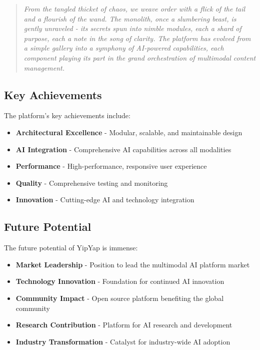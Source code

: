 \documentclass[11pt]{article}
\begin{document}
\begin{quote}
\emph{From the tangled thicket of chaos, we weave order with a flick of the tail and a flourish of the wand. The monolith, once a slumbering beast, is gently unraveled - its secrets spun into nimble modules, each a shard of purpose, each a note in the song of clarity. The platform has evolved from a simple gallery into a symphony of AI-powered capabilities, each component playing its part in the grand orchestration of multimodal content management.}
\end{quote}

\subsection{Key Achievements}

The platform's key achievements include:

\begin{itemize}
\item \textbf{Architectural Excellence} - Modular, scalable, and maintainable design
\item \textbf{AI Integration} - Comprehensive AI capabilities across all modalities
\item \textbf{Performance} - High-performance, responsive user experience
\item \textbf{Quality} - Comprehensive testing and monitoring
\item \textbf{Innovation} - Cutting-edge AI and technology integration
\end{itemize}

\subsection{Future Potential}

The future potential of YipYap is immense:

\begin{itemize}
\item \textbf{Market Leadership} - Position to lead the multimodal AI platform market
\item \textbf{Technology Innovation} - Foundation for continued AI innovation
\item \textbf{Community Impact} - Open source platform benefiting the global community
\item \textbf{Research Contribution} - Platform for AI research and development
\item \textbf{Industry Transformation} - Catalyst for industry-wide AI adoption
\end{itemize}
\end{document}
